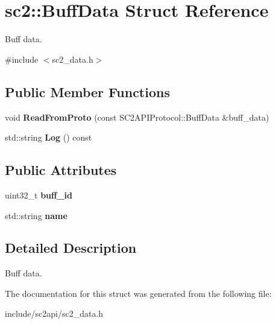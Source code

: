 \hypertarget{structsc2_1_1_buff_data}{}\section{sc2\+:\+:Buff\+Data Struct Reference}
\label{structsc2_1_1_buff_data}


Buff data.  




{\ttfamily \#include $<$sc2\+\_\+data.\+h$>$}

\subsection*{Public Member Functions}
\begin{DoxyCompactItemize}
\item 
\mbox{\label{structsc2_1_1_buff_data_a95a4fae8f7b7ece6fbd9c16ba6bd2b0a}} 
void {\bfseries Read\+From\+Proto} (const S\+C2\+A\+P\+I\+Protocol\+::\+Buff\+Data \&buff\+\_\+data)
\item 
\mbox{\label{structsc2_1_1_buff_data_acd334464556d30678a2f7aaf43265432}} 
std\+::string {\bfseries Log} () const
\end{DoxyCompactItemize}
\subsection*{Public Attributes}
\begin{DoxyCompactItemize}
\item 
\mbox{\label{structsc2_1_1_buff_data_ab5c92fdf01e7eb2d5629df664a99e0bc}} 
uint32\+\_\+t {\bfseries buff\+\_\+id}
\item 
\mbox{\label{structsc2_1_1_buff_data_a8b97134b47f6cbe973fe1eba84bc3612}} 
std\+::string {\bfseries name}
\end{DoxyCompactItemize}


\subsection{Detailed Description}
Buff data. 

The documentation for this struct was generated from the following file\+:\begin{DoxyCompactItemize}
\item 
include/sc2api/sc2\+\_\+data.\+h\end{DoxyCompactItemize}
